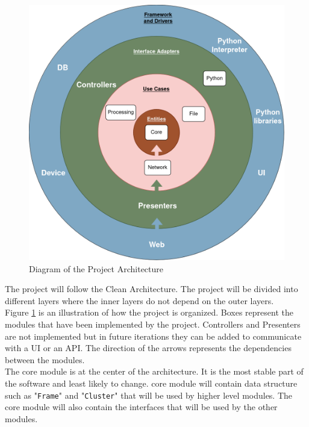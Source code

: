 \begin{spacing}{1.2}
    \begin{figure}
        \centering
        \includegraphics[width=\textwidth]{Chapitre2/figures/aare.png}
        \caption{Diagram of the Project Architecture}
        \label{fig:arch}

    \end{figure}

    The project will follow the Clean Architecture. The project will be divided into different
    layers where the inner layers do not depend on the outer layers. \\

    Figure \ref{fig:arch} is an illustration of how the project is organized.
    Boxes represent the modules that have been implemented by the project. Controllers and
    Presenters are not implemented but in future iterations they can be added to communicate with a UI or
    an API. The direction of the arrows represents the dependencies between the modules.\\

    The core module is at the center of the architecture.
    It is the most stable part of the software and least likely to change. core module will
    contain data structure such as "\lstinline|Frame|" and "\lstinline|Cluster|" that will be used by higher level modules.
    The core module will also contain the interfaces that will be used by the other modules.\\


\end{spacing}
